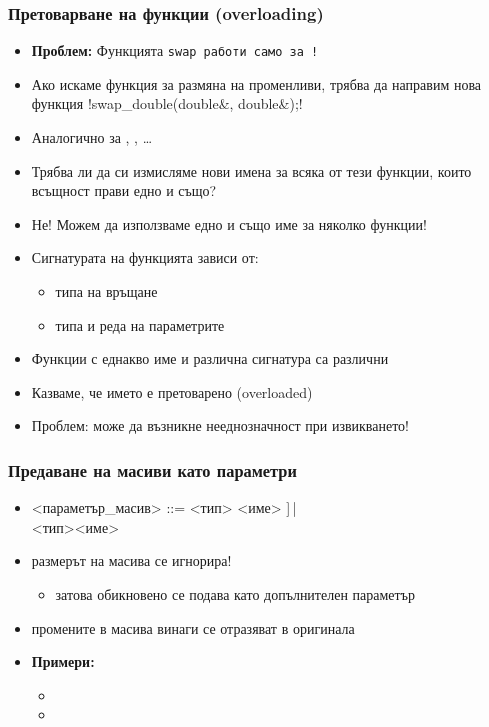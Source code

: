 \documentclass[alsotrans]{beamerswitch}
\begin{document}
\begin{frame}[fragile]
  \frametitle{Претоварване на функции (overloading)}

  \begin{itemize}[<+->]
  \item \textbf{Проблем:} Функцията \tt{swap} работи само за !
  \item Ако искаме функция за размяна на  променливи, трябва да направим нова функция \lst!swap_double(double&, double&);!
  \item Аналогично за , , \ldots
  \item Трябва ли да си измисляме нови имена за всяка от тези функции, които всъщност прави едно и също?
  \item \alert{Не!} Можем да използваме едно и също име за няколко функции!
  \item Сигнатурата на функцията зависи от:
    \begin{itemize}[<.->]
    \item типа на връщане
    \item типа и реда на параметрите
    \end{itemize}
  \item Функции с еднакво име и различна сигнатура са различни
  \item Казваме, че името е \alert{претоварено} (overloaded)
  \item \alert{Проблем}: може да възникне нееднозначност при извикването!
  \end{itemize}
\end{frame}

\begin{frame}
  \frametitle{Предаване на масиви като параметри}

  \small
  \begin{itemize}[<+->]
  \item{} <параметър\_масив> ::= <тип> <име> \tta[[<константен\_израз>]\tta]\,|\\
    \hspace{26ex}<тип>\tta* <име>
  \item размерът на масива \alert{се игнорира}!
    \begin{itemize}
    \item затова обикновено се подава като допълнителен параметър
    \end{itemize}
  \item промените в масива винаги се отразяват в оригинала
  \item \textbf{Примери:}
    \begin{itemize}
    \item {}
    \item {}
    \end{itemize}
  \end{itemize}
\end{frame}
\end{document}
